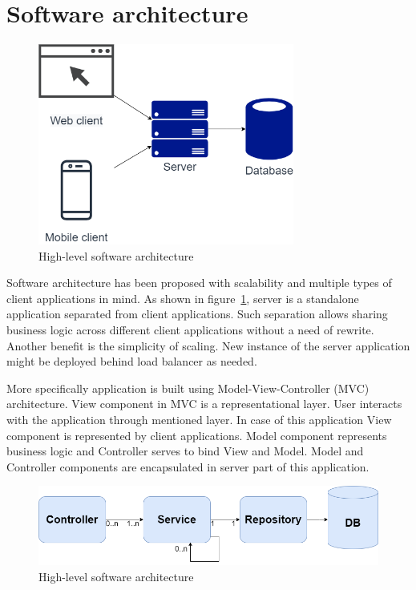 
\section{Software architecture}\label{sec:software-architecture}

\begin{figure}[h!]
    \includegraphics[width=0.75\textwidth]{images/high-level-architecture}
    \caption{High-level software architecture}
    \label{fig:high-level-architecture}
\end{figure}

Software architecture has been proposed with scalability and multiple types of client applications in mind.
As shown in figure~\ref{fig:high-level-architecture}, server is a standalone application separated from client applications.
Such separation allows sharing business logic across different client applications without a need of rewrite.
Another benefit is the simplicity of scaling.
New instance of the server application might be deployed behind load balancer as needed.

More specifically application is built using Model-View-Controller (MVC) architecture.\cite{wiki-mvc}
View component in MVC is a representational layer.
User interacts with the application through mentioned layer.
In case of this application View component is represented by client applications.
Model component represents business logic and Controller serves to bind View and Model.
Model and Controller components are encapsulated in server part of this application.

\begin{figure}[h!]
    \includegraphics[width=1\textwidth]{images/server-mvc-spring}
    \caption{High-level software architecture}
    \label{fig:server-mvc-spring}
\end{figure}

